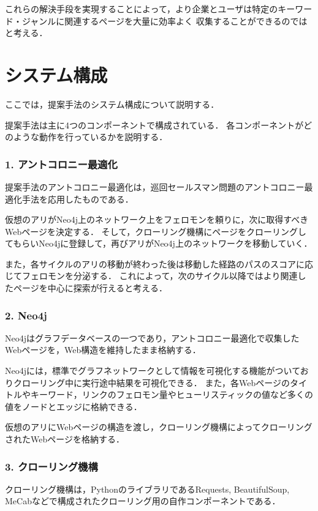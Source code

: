 これらの解決手段を実現することによって，より企業とユーザは特定のキーワード・ジャンルに関連するページを大量に効率よく
収集することができるのではと考える．

\section{システム構成}

ここでは，提案手法のシステム構成について説明する．

提案手法は主に4つのコンポーネントで構成されている．
各コンポーネントがどのような動作を行っているかを説明する．

\subsubsection{1. アントコロニー最適化}

提案手法のアントコロニー最適化は，巡回セールスマン問題のアントコロニー最適化手法を応用したものである．

仮想のアリがNeo4j上のネットワーク上をフェロモンを頼りに，次に取得すべきWebページを決定する．
そして，クローリング機構にページをクローリングしてもらいNeo4jに登録して，再びアリがNeo4j上のネットワークを移動していく．

また，各サイクルのアリの移動が終わった後は移動した経路のパスのスコアに応じてフェロモンを分泌する．
これによって，次のサイクル以降ではより関連したページを中心に探索が行えると考える．

\subsubsection{2. Neo4j}

Neo4jはグラフデータベースの一つであり，アントコロニー最適化で収集したWebページを，Web構造を維持したまま格納する．

Neo4jには，標準でグラフネットワークとして情報を可視化する機能がついておりクローリング中に実行途中結果を可視化できる．
また，各Webページのタイトルやキーワード，リンクのフェロモン量やヒューリスティックの値など多くの値をノードとエッジに格納できる．

仮想のアリにWebページの構造を渡し，クローリング機構によってクローリングされたWebページを格納する．

\subsubsection{3. クローリング機構}

クローリング機構は，PythonのライブラリであるRequests, BeautifulSoup, MeCabなどで構成されたクローリング用の自作コンポーネントである．

